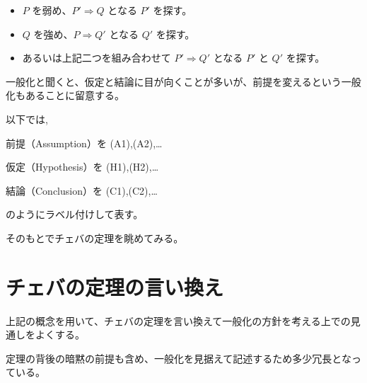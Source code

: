 \documentclass[a4paper,12pt]{bxjsbook}
\newlength{\customindent}
\newenvironment{body}{
  \par
  \begingroup
  \setlength{\leftskip}{\customindent}
  \setlength{\rightskip}{0pt}
  \setlength{\parindent}{1em}
  \setlength{\displayindent}{\customindent}
  \setlength{\displaywidth}{\dimexpr\linewidth-\customindent\relax}
}{
  \par
  \endgroup
}
\theoremstyle{theorem}
\begin{document}
    \begin{itemize}[leftmargin=3.5em]
        \item $P$ を弱め、$P'⇒Q$ となる $P'$ を探す。
        \item $Q$ を強め、$P⇒Q'$ となる $Q'$ を探す。
        \item あるいは上記二つを組み合わせて $P'⇒Q'$ となる $P'$ と $Q'$ を探す。
    \end{itemize}

    \begin{body}
        \indent 一般化と聞くと、仮定と結論に目が向くことが多いが、前提を変えるという一般化もあることに留意する。

        \indent 以下では,
        
        前提（Assumption）を (A1),(A2),\dots \par
        仮定（Hypothesis）を (H1),(H2),\dots \par
        結論（Conclusion）を (C1),(C2),\dots \par
        のようにラベル付けして表す。

        \indent そのもとでチェバの定理を眺めてみる。
    \end{body}


    \section{チェバの定理の言い換え}

    \begin{body}
        \indent 上記の概念を用いて、チェバの定理を言い換えて一般化の方針を考える上での見通しをよくする。

        \indent 定理の背後の暗黙の前提も含め、一般化を見据えて記述するため多少冗長となっている。

    \end{body}
\end{document}
